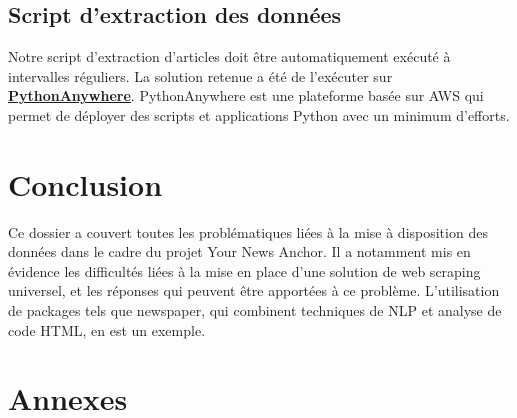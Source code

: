 \documentclass[french]{article}
\begin{document}
    \subsection{Script d'extraction des données}

    Notre script d'extraction d'articles doit être automatiquement exécuté à intervalles réguliers. La solution retenue a été de l'exécuter sur \textbf{\href{https://www.pythonanywhere.com/}{PythonAnywhere}}. PythonAnywhere est une plateforme basée sur AWS qui permet de déployer des scripts et applications Python avec un minimum d'efforts.

    \section*{Conclusion}

    Ce dossier a couvert toutes les problématiques liées à la mise à disposition des données dans le cadre du projet Your News Anchor. Il a notamment mis en évidence les difficultés liées à la mise en place d'une solution de web scraping universel, et les réponses qui peuvent être apportées à ce problème. L'utilisation de packages tels que newspaper, qui combinent techniques de NLP et analyse de code HTML, en est un exemple.


    \appendix
    \newpage
    \section*{Annexes \huge \centering}
\end{document}
